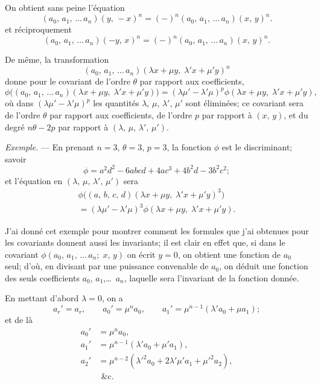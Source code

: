 \documentclass[11pt,a4paper]{article}
\theoremstyle{definition}
\begin{document}
\medskip

On obtient sans peine l'\'equation
\[
(a_0,\, a_1,\, \ldots\, a_n)(y,\, -x)^n
= (-)^n (a_0,\, a_1,\, \ldots\, a_n)(x,\, y)^n.
\]
et r\'eciproquement
\[
(a_0,\, a_1,\, \ldots\, a_n)(-y,\, x)^n
= (-)^n (a_0,\, a_1,\, \ldots\, a_n)(x,\, y)^n.
\]

De m\^eme, la transformation
\[
(a_0,\, a_1,\, \ldots\, a_n)(\lambda x + \mu y,\; \lambda' x + \mu' y)^n
\]
donne pour le covariant de l'ordre $\theta$ par rapport aux coefficients,
\[
\phi\bigl((a_0,\, a_1,\, \ldots\, a_n)(\lambda x + \mu y,\;
\lambda' x + \mu' y)\bigr)
= (\lambda\mu' - \lambda'\mu)^p \phi(\lambda x + \mu y,\; \lambda' x + \mu' y),
\]
o\`u dans $(\lambda\mu' - \lambda'\mu)^p$ les quantit\'es $\lambda$, $\mu$,
$\lambda'$, $\mu'$ sont \'elimin\'ees; ce covariant sera de l'ordre $\theta$
par rapport aux coefficients, de l'ordre $p$ par rapport \`a $(x,\, y)$,
et du degr\'e $n\theta - 2p$ par rapport \`a $(\lambda,\, \mu,\, \lambda',\, \mu')$.

\medskip

\textsl{Exemple.} --- En prenant $n=3$, $\theta=3$, $p=3$, la fonction $\phi$
est le discriminant; savoir
\[
\phi = a^2d^2 - 6abcd + 4ac^3 + 4b^2d - 3b^2c^2;
\]
et l'\'equation en $(\lambda,\, \mu,\, \lambda',\, \mu')$ sera
\begin{multline*}
\phi\bigl((a,\, b,\, c,\, d)(\lambda x + \mu y,\;
\lambda' x + \mu' y)^3\bigr) \\
= (\lambda\mu' - \lambda'\mu)^3 \phi(\lambda x + \mu y,\;
\lambda' x + \mu' y).
\end{multline*}

\medskip

J'ai donn\'e cet exemple pour montrer comment les formules que j'ai
obtenues pour les covariants donnent aussi les invariants; il est clair en
effet que, si dans le covariant $\phi(a_0,\, a_1,\, \ldots\, a_n;\; x,\, y)$
on \'ecrit $y=0$, on obtient une fonction de $a_0$ seul; d'o\`u, en divisant
par une puissance convenable de $a_0$, on d\'eduit une fonction des seuls
coefficients $a_0$, $a_1$,\ldots\ $a_n$, laquelle sera l'invariant de la
fonction donn\'ee.

\medskip

En mettant d'abord $\lambda=0$, on a
\[
a_r' = a_r,\qquad a_0' = \mu^n a_0,\qquad a_1' = \mu^{n-1}(\lambda' a_0 + \mu a_1);
\]
et de l\`a
\begin{align*}
a_0' &= \mu^n a_0, \\
a_1' &= \mu^{n-1}(\lambda' a_0 + \mu' a_1), \\
a_2' &= \mu^{n-2}(\lambda'^2 a_0 + 2\lambda'\mu' a_1 + \mu'^2 a_2), \\
& \ \,\text{\&c.}
\end{align*}
\end{document}
